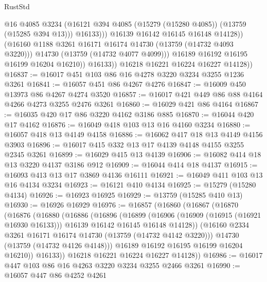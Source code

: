 \begin{lexlean}{RustStd}
\begin{coremodule}
                            @16
                            @4085
                            @3234
                            (@16121 @394 @4085 (@15279 (@15280 @4085)) (@13759 (@15285 @394 @13)))
                            @16133)))
                      @16139
                      @16142
                      @16145
                      @16148
                      @14128))
                  (@16160 @1188 @3261 @16171 @16174 @14730 (@13759 (@14732 @4093 @3220)))
                  @14730
                  (@13759 (@14732 @4077 @4099)))
                @16189
                @16192
                @16195
                @16199
                @16204
                @16210))
            @16133))
        @16218
        @16221
        @16224
        @16227
        @14128))
@16837 := @16017 @451 @103 @86 @16 @4278 @3220 @3234 @3255 @1236 @3261
@16841 := @16057 @451 @86 @4267 @4276
@16847 := @16009 @450 @13973 @86 @4267 @4274 @3520
@16857 := @16017 @421 @449 @86 @88 @4164 @4266 @4273 @3255 @2476 @3261
@16860 := @16029 @421 @86 @4164
@16867 := @16035 @420 @17 @86 @3220 @4162 @3186 @885
@16870 := @16044 @420 @17 @4162
@16876 := @16049 @418 @103 @13 @16 @4160 @3234
@16880 := @16057 @418 @13 @4149 @4158
@16886 := @16062 @417 @18 @13 @4149 @4156 @3903
@16896 := @16017 @415 @332 @13 @17 @4139 @4148 @4155 @3255 @2345 @3261
@16899 := @16029 @415 @13 @4139
@16906 := @16082 @414 @18 @13 @3220 @4137 @3186 @912
@16909 := @16044 @414 @18 @4137
@16915 := @16093 @413 @13 @17 @3869 @4136 @16111
@16921 := @16049 @411 @103 @13 @16 @4134 @3234
@16923 := @16121 @410 @4134
@16925 := @15279 (@15280 @4134)
@16926 := @16923 @16925
@16929 := @13759 (@15285 @410 @13)
@16930 := @16926 @16929
@16976 := @16857
    (@16860
      (@16867
        (@16870
          (@16876
            (@16880
              (@16886
                (@16896
                  (@16899
                    (@16906
                      (@16909 (@16915 (@16921 @16930 @16133)))
                      @16139
                      @16142
                      @16145
                      @16148
                      @14128))
                  (@16160 @2334 @3261 @16171 @16174 @14730 (@13759 (@14732 @4142 @3220)))
                  @14730
                  (@13759 (@14732 @4126 @4148)))
                @16189
                @16192
                @16195
                @16199
                @16204
                @16210))
            @16133))
        @16218
        @16221
        @16224
        @16227
        @14128))
@16986 := @16017 @447 @103 @86 @16 @4263 @3220 @3234 @3255 @2466 @3261
@16990 := @16057 @447 @86 @4252 @4261

\end{coremodule}
\end{lexlean}
